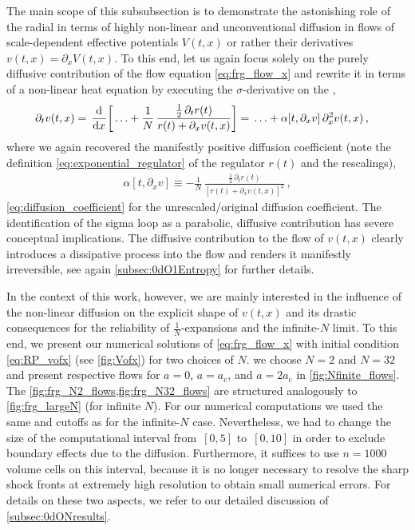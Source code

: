 The main scope of this subsubsection is to demonstrate the astonishing role of the radial \sigmaMode{} in terms of highly non-linear and unconventional diffusion in \frg{} flows of scale-dependent effective potentials $V ( t, x )$ or rather their derivatives $v ( t, x ) = \partial_x V ( t, x )$.
To this end, let us again focus solely on the purely diffusive contribution of the \frg{} flow equation \eqref{eq:frg_flow_x} and rewrite it in terms of a non-linear heat equation by executing the $\sigma$-derivative on the \rhs{},
	\begin{align}
		\partial_t v ( t, x ) &= \, \dod{}{x}\! \bigg[ \ldots + \frac{1}{N} \, \frac{\tfrac{1}{2} \, \partial_t r ( t )}{r ( t ) + \partial_x v ( t, x )} \bigg] 
		= \, \ldots + \alpha [ t, \partial_x v ] \, \partial_x^2 v ( t, x ) \, , \nonumber
	\end{align}
where we again recovered the manifestly positive diffusion coefficient (note the definition \eqref{eq:exponential_regulator} of the regulator $r ( t )$ and the rescalings),
	\begin{align}
		\alpha [ t, \partial_x v ] \equiv - \frac{1}{N} \, \frac{\tfrac{1}{2} \, \partial_t r ( t )}{[ r ( t ) + \partial_x v ( t, x ) ]^2} \, ,	\label{eq:diffusion_coefficient_resc}
	\end{align}
\cf{} \cref{eq:diffusion_coefficient} for the unrescaled/original diffusion coefficient.
The identification of the sigma loop as a parabolic, diffusive contribution has severe conceptual implications.
The diffusive contribution to the flow of $v ( t, x )$ clearly introduces a dissipative process into the \frg{} flow and renders it manifestly irreversible, see again \cref{subsec:0dO1Entropy} for further details.
	
In the context of this work, however, we are mainly interested in the influence of the non-linear diffusion on the explicit shape of $v ( t, x )$ and its drastic consequences for the reliability of $\tfrac{1}{N}$-expansions and the infinite-$N$ limit.
To this end, we present our numerical solutions of \cref{eq:frg_flow_x} with initial condition \eqref{eq:RP_vofx} (see \cref{fig:Vofx}) for two choices of $N$. 
\WlogA{} we choose $N = 2$ and $N = 32$ and present respective \frg{} flows for $a = 0$, $a = a_\mathrm{c}$, and $a = 2 a_\mathrm{c}$ in \cref{fig:Nfinite_flows}.
The \cref{fig:frg_N2_flows,fig:frg_N32_flows} are structured analogously to \cref{fig:frg_largeN} (for infinite $N$).
For our numerical computations we used the same \uv{} and \ir{} cutoffs as for the infinite-$N$ case.
Nevertheless, we had to change the size of the computational interval from~${[0, 5]}$ to~${[ 0, 10 ]}$ in order to exclude boundary effects due to the diffusion.
Furthermore, it suffices to use $n = 1000$ volume cells on this interval, because it is no longer necessary to resolve the sharp shock fronts at extremely high resolution to obtain small numerical errors.
For details on these two aspects, we refer to our detailed discussion of \cref{subsec:0dONresults}.\bigskip

